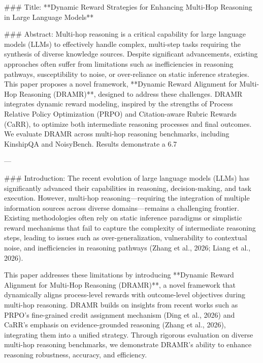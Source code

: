 ### Title:
**Dynamic Reward Strategies for Enhancing Multi-Hop Reasoning in Large Language Models**

### Abstract:
Multi-hop reasoning is a critical capability for large language models (LLMs) to effectively handle complex, multi-step tasks requiring the synthesis of diverse knowledge sources. Despite significant advancements, existing approaches often suffer from limitations such as inefficiencies in reasoning pathways, susceptibility to noise, or over-reliance on static inference strategies. This paper proposes a novel framework, **Dynamic Reward Alignment for Multi-Hop Reasoning (DRAMR)**, designed to address these challenges. DRAMR integrates dynamic reward modeling, inspired by the strengths of Process Relative Policy Optimization (PRPO) and Citation-aware Rubric Rewards (CaRR), to optimize both intermediate reasoning processes and final outcomes. We evaluate DRAMR across multi-hop reasoning benchmarks, including KinshipQA and NoisyBench. Results demonstrate a 6.7%

---

### Introduction:
The recent evolution of large language models (LLMs) has significantly advanced their capabilities in reasoning, decision-making, and task execution. However, multi-hop reasoning—requiring the integration of multiple information sources across diverse domains—remains a challenging frontier. Existing methodologies often rely on static inference paradigms or simplistic reward mechanisms that fail to capture the complexity of intermediate reasoning steps, leading to issues such as over-generalization, vulnerability to contextual noise, and inefficiencies in reasoning pathways (Zhang et al., 2026; Liang et al., 2026).

This paper addresses these limitations by introducing **Dynamic Reward Alignment for Multi-Hop Reasoning (DRAMR)**, a novel framework that dynamically aligns process-level rewards with outcome-level objectives during multi-hop reasoning. DRAMR builds on insights from recent works such as PRPO's fine-grained credit assignment mechanism (Ding et al., 2026) and CaRR's emphasis on evidence-grounded reasoning (Zhang et al., 2026), integrating them into a unified strategy. Through rigorous evaluation on diverse multi-hop reasoning benchmarks, we demonstrate DRAMR's ability to enhance reasoning robustness, accuracy, and efficiency.

